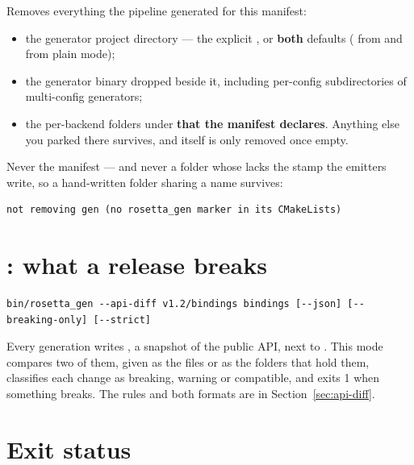 Removes everything the pipeline generated for this manifest:

\begin{itemize}
  \item the generator project directory --- the explicit , or
    \textbf{both} defaults ( from  and
     from plain mode);
  \item the generator binary dropped beside it, including per-config
    subdirectories of multi-config generators;
  \item the per-backend folders under  \textbf{that the manifest
    declares}. Anything else you parked there survives, and 
    itself is only removed once empty.
\end{itemize}

Never the manifest --- and never a folder whose  lacks the
 stamp the emitters write, so a hand-written folder
sharing a name survives:

\begin{lstlisting}[style=plain]
not removing gen (no rosetta_gen marker in its CMakeLists)
\end{lstlisting}

\section{: what a release breaks}

\begin{lstlisting}[style=sh]
bin/rosetta_gen --api-diff v1.2/bindings bindings [--json] [--breaking-only] [--strict]
\end{lstlisting}

Every generation writes , a snapshot of the public API, next to
. This mode compares two of them, given as the files or as
the folders that hold them, classifies each change as breaking, warning or
compatible, and exits 1 when something breaks. The rules and both formats are
in Section~\ref{sec:api-diff}.

\section{Exit status}

